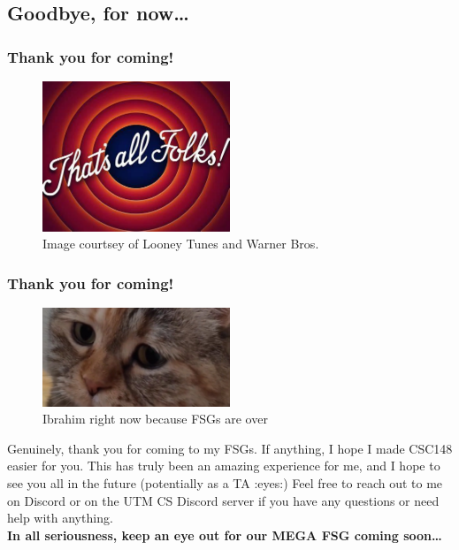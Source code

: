 \documentclass[hyperref={colorlinks,citecolor=blue,linkcolor=blue,urlcolor=blue}, aspectratio=1610]{beamer}
\begin{document}
\subsection{Goodbye, for now\ldots}

\begin{frame}
  \frametitle{Thank you for coming!}
  \centering
  \begin{figure}
    \includegraphics[width=0.5\textwidth]{that's_all_folks.jpeg}
    \caption{Image courtsey of Looney Tunes\texttrademark{} and Warner Bros.\texttrademark{}}
  \end{figure}
\end{frame}

\begin{frame}
  \frametitle{Thank you for coming!}
  \centering
  \begin{figure}
    \includegraphics[width=0.5\textwidth]{sadcatcover.jpg}
    \caption{Ibrahim right now because FSGs are over}
  \end{figure}
  Genuinely, thank you for coming to my FSGs. If anything, I hope I made CSC148 easier for you. This has truly been an amazing experience for me, and I hope to see you all in the future (potentially as a TA :eyes:)
  Feel free to reach out to me on Discord or on the UTM CS Discord server if you have any questions or need help with anything.\\

  \textbf{In all seriousness, keep an eye out for our MEGA FSG coming soon\ldots}
\end{frame}
\end{document}
